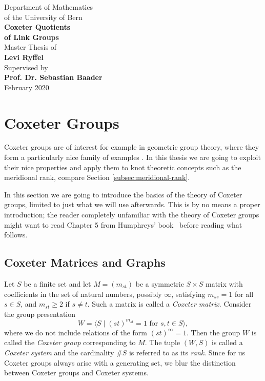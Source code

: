 \documentclass{article}
\theoremstyle{definition}
\begin{document}
\begin{titlepage}
\begin{center}
\vspace*{1.5cm}
\Large{Department of Mathematics \\ of the University of Bern}\\
\vspace*{3.5cm}
\Huge{\textbf{Coxeter Quotients \\ of Link Groups}}\\
\vspace*{6.5cm}
\Large{Master Thesis of} \\ \Large{\textbf{Levi Ryffel}}\\
\vspace*{.25cm}
Supervised by \\ \textbf{Prof. Dr. Sebastian Baader}\\
\vspace*{2cm}
February 2020
\end{center}
\end{titlepage}

\tableofcontents
\newpage

\section{Coxeter Groups}
Coxeter groups are of interest for example in geometric group theory, where they form a particularly nice family of examples \cite{davis2008}.
In this thesis we are going to exploit their nice properties and apply them to knot theoretic concepts such as the meridional rank, compare Section \ref{subsec:meridional-rank}.

In this section we are going to introduce the basics of the theory of Coxeter groups, limited to just what we will use afterwards. This is by no means a proper introduction; the reader completely unfamiliar with the theory of Coxeter groups might want to read Chapter 5 from Humphreys' book~\cite{humphreys1990} before reading what follows.

\subsection{Coxeter Matrices and Graphs}
Let $S$ be a finite set and let $M = (m_{st})$ be a symmetric $S \times S$ matrix with coefficients in the set of natural numbers, possibly $\infty$, satisfying $m_{ss} = 1$ for all $s \in S$, and $m_{st} \geq 2$ if $s \ne t$. Such a matrix is called a \textit{Coxeter matrix}. Consider the group presentation
$$W = \langle S \; | \; (st)^{m_{st}} = 1 \text{ for } s,t\in S \rangle,$$
where we do not include relations of the form $(st)^\infty = 1$.
Then the group $W$ is called the \textit{Coxeter group} corresponding to $M$. The tuple $(W,S)$ is called a \textit{Coxeter system} and the cardinality $\#S$ is referred to as its \textit{rank}. Since for us Coxeter groups always arise with a generating set, we blur the distinction between Coxeter groups and Coxeter systems.
\end{document}
